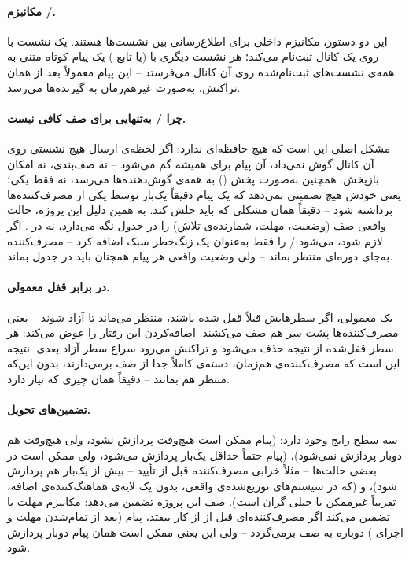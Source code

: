 \paragraph{مکانیزم /.} این دو دستور، مکانیزم داخلی  برای اطلاع‌رسانی بین نشست‌ها هستند. یک نشست با  روی یک کانال ثبت‌نام می‌کند؛ هر نشست دیگری با  (یا تابع ) یک پیام کوتاه متنی به همه‌ی نشست‌های ثبت‌نام‌شده روی آن کانال می‌فرستد -- این پیام معمولاً بعد از  همان تراکنش، به‌صورت غیرهم‌زمان به گیرنده‌ها می‌رسد.

\paragraph{چرا / به‌تنهایی برای صف کافی نیست.} مشکل اصلی این است که  هیچ حافظه‌ای ندارد: اگر لحظه‌ی ارسال هیچ نشستی روی آن کانال گوش نمی‌داد، آن پیام برای همیشه گم می‌شود -- نه صف‌بندی، نه امکان بازپخش. همچنین  به‌صورت پخش () به همه‌ی گوش‌دهنده‌ها می‌رسد، نه فقط یکی؛ یعنی خودش هیچ تضمینی نمی‌دهد که یک پیام دقیقاً یک‌بار توسط یکی از مصرف‌کننده‌ها برداشته شود -- دقیقاً همان مشکلی که  باید حلش کند. به همین دلیل این پروژه، حالت واقعی صف (وضعیت، مهلت، شمارنده‌ی تلاش) را در جدول  نگه می‌دارد، نه در . اگر لازم شود، می‌شود / را فقط به‌عنوان یک زنگ‌خطر سبک اضافه کرد -- مصرف‌کننده به‌جای  دوره‌ای منتظر  بماند -- ولی وضعیت واقعی هر پیام همچنان باید در جدول بماند.

\paragraph{ در برابر قفل معمولی.} یک  معمولی، اگر سطرهایش قبلاً قفل شده باشند، منتظر می‌ماند تا آزاد شوند -- یعنی مصرف‌کننده‌ها پشت سر هم صف می‌کشند. اضافه‌کردن  \cite{pglocking} این رفتار را عوض می‌کند: هر سطر قفل‌شده از نتیجه حذف می‌شود و تراکنش می‌رود سراغ سطر آزاد بعدی. نتیجه این است که  مصرف‌کننده‌ی هم‌زمان،  دسته‌ی کاملاً جدا از صف برمی‌دارند، بدون این‌که منتظر هم بمانند -- دقیقاً همان چیزی که  نیاز دارد.

\paragraph{تضمین‌های تحویل.} سه سطح رایج وجود دارد:  (پیام ممکن است هیچ‌وقت پردازش نشود، ولی هیچ‌وقت هم دوبار پردازش نمی‌شود)،  (پیام حتماً حداقل یک‌بار پردازش می‌شود، ولی ممکن است در بعضی حالت‌ها -- مثلاً خرابی مصرف‌کننده قبل از تأیید -- بیش از یک‌بار هم پردازش شود)، و  (که در سیستم‌های توزیع‌شده‌ی واقعی، بدون یک لایه‌ی هماهنگ‌کننده‌ی اضافه، تقریباً غیرممکن یا خیلی گران است). صف این پروژه تضمین  می‌دهد: مکانیزم مهلت با  تضمین می‌کند اگر مصرف‌کننده‌ای قبل از  از کار بیفتد، پیام (بعد از تمام‌شدن مهلت و اجرای ) دوباره به صف برمی‌گردد -- ولی این یعنی ممکن است همان پیام دوبار پردازش شود.

